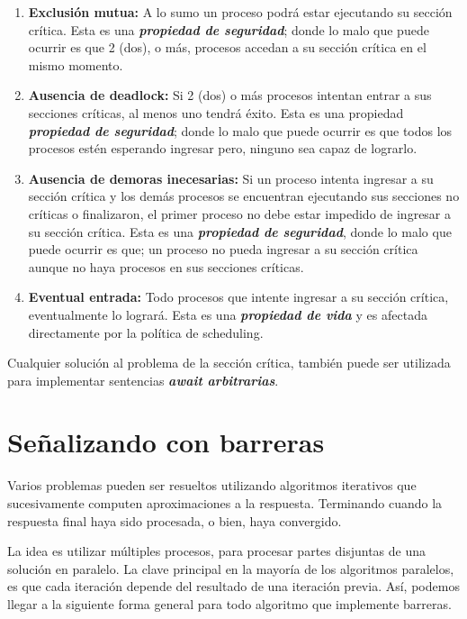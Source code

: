\documentclass[a4paper, 11pt]{book}
\begin{document}
\begin{enumerate}
    \item \textbf{Exclusión mutua:} A lo sumo un proceso podrá estar ejecutando su sección crítica. Esta es una \textbf{\emph{propiedad de seguridad}}; donde lo malo que puede ocurrir es que 2 (dos), o más, procesos accedan a su sección crítica en el mismo momento.
    \item \textbf{Ausencia de deadlock:} Si 2 (dos) o más procesos intentan entrar a sus secciones críticas, al menos uno tendrá éxito. Esta es una propiedad \textbf{\emph{propiedad de seguridad}}; donde lo malo que puede ocurrir es que todos los procesos estén esperando ingresar pero, ninguno sea capaz de lograrlo.
    \item \textbf{Ausencia de demoras inecesarias:} Si un proceso intenta ingresar a su sección crítica y los demás procesos se encuentran ejecutando sus secciones no críticas o finalizaron, el primer proceso no debe estar impedido de ingresar a su sección crítica. Esta es una \textbf{\emph{propiedad de seguridad}}, donde lo malo que puede ocurrir es que; un proceso no pueda ingresar a su sección crítica aunque no haya procesos en sus secciones críticas.
    \item \textbf{Eventual entrada:} Todo procesos que intente ingresar a su sección crítica, eventualmente lo logrará. Esta es una \textbf{\emph{propiedad de vida}} y es afectada directamente por la política de scheduling.
\end{enumerate}

Cualquier solución al problema de la sección crítica, también puede ser utilizada para implementar sentencias \textbf{\emph{await arbitrarias}}.

\section{Señalizando con barreras}

Varios problemas pueden ser resueltos utilizando algoritmos iterativos que sucesivamente computen aproximaciones a la respuesta. Terminando cuando la respuesta final haya sido procesada, o bien, haya convergido.

La idea es utilizar múltiples procesos, para procesar partes disjuntas de una solución en paralelo. La clave principal en la mayoría de los algoritmos paralelos, es que cada iteración depende del resultado de una iteración previa. Así, podemos llegar a la siguiente forma general para todo algoritmo que implemente barreras.
\end{document}
